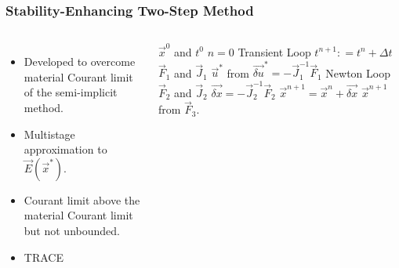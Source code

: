 \documentclass[compress,xcolor=table]{beamer}
\begin{document}
\begin{frame}
\frametitle{Stability-Enhancing Two-Step Method}

\begin{columns}

\begin{itemize}
\item{Developed to overcome material Courant limit of the semi-implicit method.}
\item{Multistage approximation to $\vec{E}(\vec{x}^{*})$.}
\item{Courant limit above the material Courant limit but not unbounded.}
\item{TRACE}
\end{itemize}

\begin{algorithmic}
\scriptsize
\Require $\vec{x}^{0}$ and $t^{0}$
\Set $n = 0$
\Loop \; Transient Loop
    \State $t^{n+1} : = t^{n} + \Delta t$
	\Calculate $\vec{F}_1$ and $\vec{J}_1$
	\Calculate $\vec{u}^{*}$ from $\vec{\delta u}^{*} = -\vec{J}^{-1}_1\vec{F}_1$
	\Loop \; Newton Loop
		\Calculate $\vec{F}_2$ and $\vec{J}_2$
		\Calculate $\vec{\delta x} = - \vec{J}_2^{-1}\vec{F}_2$
		\Calculate $\vec{x}^{n+1} = \vec{x}^{n} + \vec{\delta x}$
	\EndLoop
	\Calculate $\vec{x}^{n+1}$ from $\vec{F}_3$.
\end{algorithmic}

\end{columns}
\end{frame}
\end{document}
